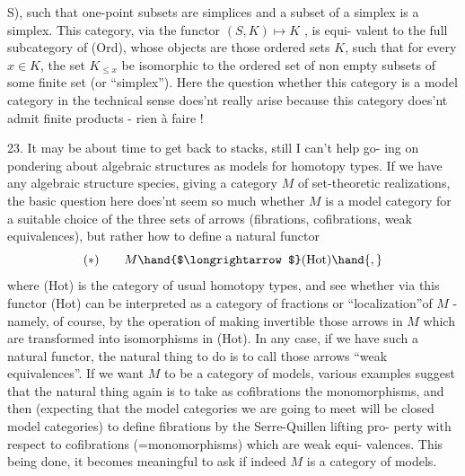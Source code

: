
S),  such that one-point subsets are simplices and a subset of a simplex
is a simplex.  This category,  via the functor   $(S,K)\mapsto K$ ,  is equi-%
valent to the full subcategory of (Ord),  whose objects are those ordered
sets $K$,  such that for every $x\in K$,  the set $K_{\leq x}$  be isomorphic to the
ordered set of  non empty subsets of some finite set (or ``simplex'').
Here  the question  whether  this category is a model category
in the technical sense \inserted{[of Quillen]} does'nt really arise\hand{,} because this category
does'nt  admit finite products -  rien à faire !

23.  It may be about time to get back to stacks,  still I can't help go-%
ing on pondering about algebraic structures as models for homotopy types.
If we have any algebraic structure species,  giving  a category $M$ of
set-theoretic realizations,  the basic question here does'nt seem so
much whether $M$ is a model category for a suitable choice of the three
sets of arrows (fibrations,  cofibrations,  weak equivalences),  but
rather how to define a natural functor
\[ (*) \qquad M \hand{$\longrightarrow$} (\mathrm{Hot}) \hand{,} \]
where (Hot) is the category of usual homotopy types,  and see whether
via this functor (Hot) can be interpreted as a category of fractions
\hand{(}or ``localization''\hand{)}of $M$  -  namely,  of course,  by the operation of making
invertible those arrows in $M$ which are transformed into isomorphisms
in (Hot).  In any case,  if we have such a natural functor,  the natural
thing to do is to call those arrows ``weak equivalences''.  If we want $M$
to be a category of models,  various examples suggest that the natural
thing again is to take as cofibrations the monomorphisms,\hand{,} and then
(expecting that the model categories we are going to meet will be closed
model categories) to define fibrations by the Serre-Quillen lifting pro-%
perty with respect to cofibrations (=monomorphisms) which are weak equi-%
valences.  This being done,  it becomes meaningful to ask if indeed $M$
is a category of models.

